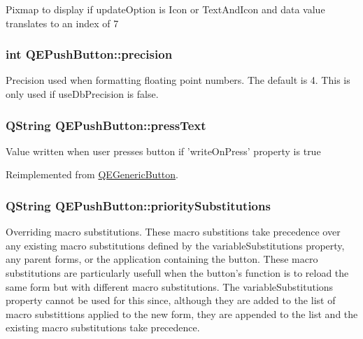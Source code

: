 \label{classQEPushButton_a4d04d0e65d8128bb377469261647b436}
Pixmap to display if updateOption is Icon or TextAndIcon and data value translates to an index of 7 \hypertarget{classQEPushButton_ae4b790894ce57d9d16321ab084ef465b}{
\subsubsection[{precision}]{\setlength{\rightskip}{0pt plus 5cm}int QEPushButton::precision}}
\label{classQEPushButton_ae4b790894ce57d9d16321ab084ef465b}
Precision used when formatting floating point numbers. The default is 4. This is only used if useDbPrecision is false. \hypertarget{classQEPushButton_a8a9405380dd087993785efcc351cefe5}{
\subsubsection[{pressText}]{\setlength{\rightskip}{0pt plus 5cm}QString QEPushButton::pressText}}
\label{classQEPushButton_a8a9405380dd087993785efcc351cefe5}
Value written when user presses button if 'writeOnPress' property is true 

Reimplemented from \hyperlink{classQEGenericButton}{QEGenericButton}.

\hypertarget{classQEPushButton_af37f9c3f00647a65d0765bdebe3f228a}{
\subsubsection[{prioritySubstitutions}]{\setlength{\rightskip}{0pt plus 5cm}QString QEPushButton::prioritySubstitutions}}
\label{classQEPushButton_af37f9c3f00647a65d0765bdebe3f228a}
Overriding macro substitutions. These macro substitions take precedence over any existing macro substitutions defined by the variableSubstitutions property, any parent forms, or the application containing the button. These macro substitutions are particularly usefull when the button's function is to reload the same form but with different macro substitutions. The variableSubstitutions property cannot be used for this since, although they are added to the list of macro substittions applied to the new form, they are appended to the list and the existing macro substitutions take precedence. 


